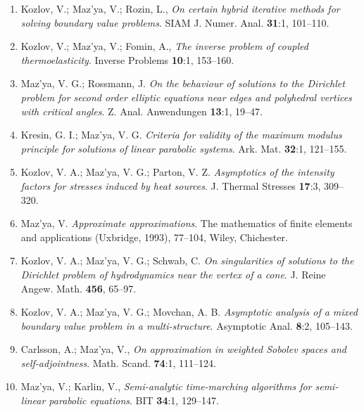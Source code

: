 \documentclass{article}
\begin{document}
\begin{enumerate}
{\bf 1994}
\item Kozlov, V.; Maz'ya, V.; Rozin, L., {\it On certain hybrid
iterative
methods for solving
  boundary value problems}. SIAM J. Numer. Anal. {\bf 31}:1, 101--110.
\item Kozlov, V.; Maz'ya, V.; Fomin, A., {\it The inverse problem of
coupled thermoelasticity}.
Inverse Problems {\bf 10}:1, 153--160.
\item Maz'ya, V. G.; Rossmann, J. {\it On the behaviour of solutions
to the
Dirichlet problem for second order elliptic
equations near edges and polyhedral vertices with critical angles}. Z.
Anal. Anwendungen {\bf 13}:1, 19--47.
\item Kresin, G. I.; Maz'ya, V. G. {\it Criteria for validity of the
maximum modulus principle for solutions
  of linear parabolic systems}. Ark. Mat. {\bf 32}:1, 121--155.
\item Kozlov, V. A.; Maz'ya, V. G.; Parton, V. Z. {\it Asymptotics of
the
intensity factors for stresses induced by heat
  sources}. J. Thermal Stresses {\bf 17}:3, 309--320.
\item Maz'ya, V. {\it Approximate approximations}. The mathematics of
finite elements and applications
(Uxbridge, 1993), 77--104, Wiley, Chichester.
\item Kozlov, V. A.; Maz'ya, V. G.; Schwab, C. {\it On singularities
of
solutions to the Dirichlet problem of
  hydrodynamics near the vertex of a cone}. J. Reine Angew. Math. {\bf
456},
65--97.
\item Kozlov, V. A.; Maz'ya, V. G.; Movchan, A. B. {\it Asymptotic
analysis
of a mixed boundary value
problem in a multi-structure}. Asymptotic Anal. {\bf 8}:2, 105--143.
\item Carlsson, A.; Maz'ya, V., {\it On approximation in weighted
Sobolev
spaces and self-adjointness}.
Math. Scand. {\bf 74}:1, 111--124.
\item Maz'ya, V.; Karlin, V., {\it Semi-analytic time-marching
algorithms
for semi-linear
parabolic equations}. BIT {\bf 34}:1, 129--147.\hfill\break


\end{enumerate}
\end{document}
